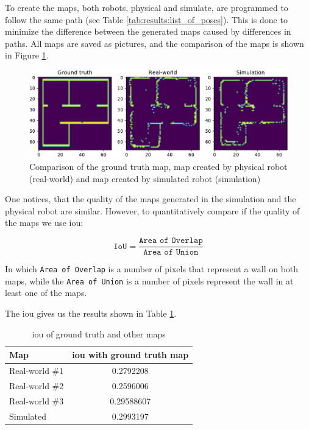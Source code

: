 To create the maps, both robots, physical and simulate, are programmed to follow the same path (see Table \ref{tab:results:list_of_poses}).
This is done to minimize the difference between the generated maps caused by differences in paths.
All maps are saved as pictures, and the comparison of the maps is shown in Figure \ref{fig:results:map_comparison}.

\begin{figure}[H]
    \centering
    \includegraphics[width=\textwidth]{./results/figures/map_comparison.pdf}
    \caption{Comparison of the ground truth map, map created by physical robot (real-world) and map created by simulated robot (simulation)}
    \label{fig:results:map_comparison}
\end{figure}

One notices, that the quality of the maps generated in the simulation and the physical robot are similar.
However, to quantitatively compare if the quality of the maps we use \ac{iou}:

\begin{equation}
    \texttt{IoU} = \frac{\texttt{Area of Overlap}}{\texttt{Area of Union}}
\end{equation}

In which \texttt{Area of Overlap} is a number of pixels that represent a wall on both maps, while the \texttt{Area of Union} is a number of pixels represent the wall in at least one of the maps.

The \ac{iou} gives us the results shown in Table \ref{tab:results:map_iou}.

\begin{table}[H]
    \centering
    \begin{tabular}{|l|c|}
        \hline
        \textbf{Map} & \textbf{\acs{iou} with ground truth map} \\
        \hline
        Real-world \#1 & 0.2792208 \\
        \hline
        Real-world \#2 & 0.2596006 \\
        \hline
        Real-world \#3 & 0.29588607 \\
        \hline
        Simulated & 0.2993197 \\
        \hline
    \end{tabular}
    \caption{\ac{iou} of ground truth and other maps}
    \label{tab:results:map_iou}
\end{table}

